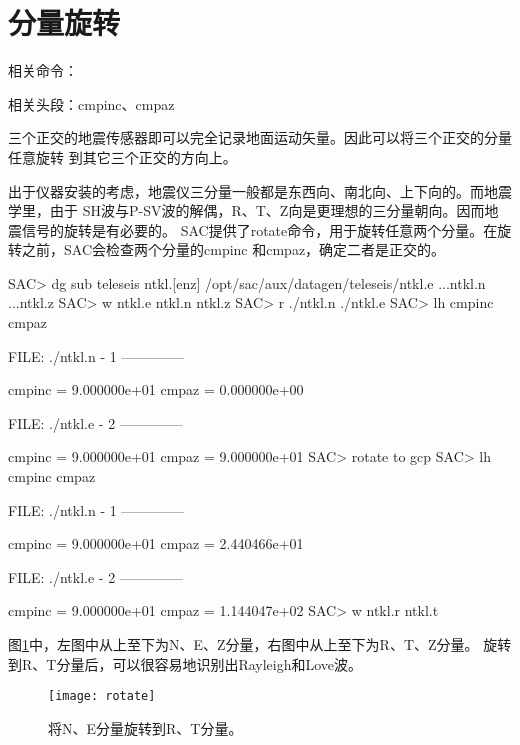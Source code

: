 \section{分量旋转}
\label{sec:traces-rotating}
相关命令：

相关头段：cmpinc、cmpaz

三个正交的地震传感器即可以完全记录地面运动矢量。因此可以将三个正交的分量任意旋转
到其它三个正交的方向上。

出于仪器安装的考虑，地震仪三分量一般都是东西向、南北向、上下向的。而地震学里，由于
SH波与P-SV波的解偶，R、T、Z向是更理想的三分量朝向。因而地震信号的旋转是有必要的。
SAC提供了rotate命令，用于旋转任意两个分量。在旋转之前，SAC会检查两个分量的cmpinc
和cmpaz，确定二者是正交的。

\begin{SACCode}
SAC> dg sub teleseis ntkl.[enz]
/opt/sac/aux/datagen/teleseis/ntkl.e ...ntkl.n ...ntkl.z
SAC> w ntkl.e ntkl.n ntkl.z
SAC> r ./ntkl.n ./ntkl.e
SAC> lh cmpinc cmpaz
  
  FILE: ./ntkl.n - 1
 --------------

     cmpinc = 9.000000e+01
      cmpaz = 0.000000e+00
  
  FILE: ./ntkl.e - 2
 --------------

     cmpinc = 9.000000e+01
      cmpaz = 9.000000e+01
SAC> rotate to gcp
SAC> lh cmpinc cmpaz
  
  FILE: ./ntkl.n - 1
 --------------

     cmpinc = 9.000000e+01
      cmpaz = 2.440466e+01
  
  FILE: ./ntkl.e - 2
 --------------

     cmpinc = 9.000000e+01
      cmpaz = 1.144047e+02
SAC> w ntkl.r ntkl.t
\end{SACCode}

图\ref{fig:rotate}中，左图中从上至下为N、E、Z分量，右图中从上至下为R、T、Z分量。
旋转到R、T分量后，可以很容易地识别出Rayleigh和Love波。

\begin{figure}[H]
\centering
\texttt{[image: rotate]}
\caption[水平分量旋转]{将N、E分量旋转到R、T分量。}
\label{fig:rotate}
\end{figure}
